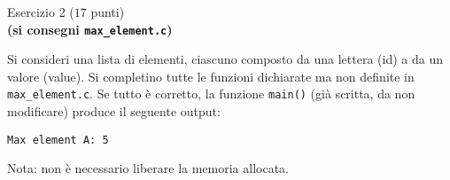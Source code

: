 \documentclass[12pt]{article}
\begin{document}
\newpage
\begin{center}{\Large Esercizio 2} ($17$ punti)\\
\textbf{(si consegni \texttt{max\_element.c})}
\end{center}

Si consideri una lista di elementi, ciascuno composto da una lettera (id) a da un valore (value).
Si completino tutte le funzioni dichiarate ma non definite in \texttt{max\_element.c}.
Se tutto \`e corretto, la funzione \texttt{main()} (gi\`a scritta, da non modificare)
produce il seguente output:
\begin{mdframed}[backgroundcolor=verylightgray] 
\begin{verbatim}
Max element A: 5
\end{verbatim}
\end{mdframed}
Nota: non \`e necessario liberare la memoria allocata.  
\end{document}
